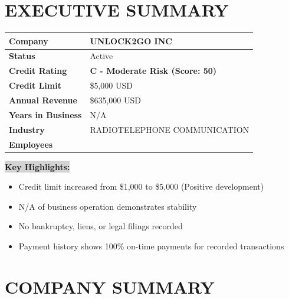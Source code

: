 \documentclass[11pt,a4paper]{article}
\newcommand{\creditrating}[1]{\textbf{\textcolor{uptrendblue}{#1}}}
\newcommand{\highlight}[1]{\colorbox{lightgray}{\textbf{#1}}}
\begin{document}
\newpage

\section*{EXECUTIVE SUMMARY}

\begin{tabular}{|>{\raggedright\arraybackslash}p{3.5cm}|>{\raggedright\arraybackslash}p{11.5cm}|}
\hline
\rowcolor{lightgray}
\textbf{Company} & UNLOCK2GO INC \\
\hline
\textbf{Status} & Active \\
\hline
\textbf{Credit Rating} & \creditrating{C - Moderate Risk (Score: 50)} \\
\hline
\textbf{Credit Limit} & \$5,000 USD \\
\hline
\textbf{Annual Revenue} & \$635,000 USD \\
\hline
\textbf{Years in Business} & N/A \\
\hline
\textbf{Industry} & RADIOTELEPHONE COMMUNICATION \\
\hline
\textbf{Employees} & 1 \\
\hline
\end{tabular}

\vspace{0.5cm}

\highlight{Key Highlights:}
\begin{itemize}[leftmargin=0.5cm]
    \item Credit limit increased from \$1,000 to \$5,000 (Positive development)
    \item N/A of business operation demonstrates stability
    \item No bankruptcy, liens, or legal filings recorded
    \item Payment history shows 100\% on-time payments for recorded transactions
\end{itemize}

\newpage

\tableofcontents

\newpage

\section{COMPANY SUMMARY}
\end{document}
